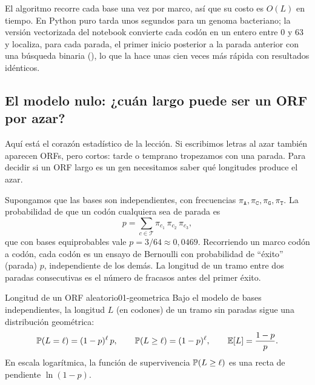 El algoritmo recorre cada base una vez por marco, así que su costo es $O(L)$ en tiempo. En Python puro tarda unos segundos para un genoma bacteriano; la versión vectorizada del notebook convierte cada codón en un entero entre 0 y 63 y localiza, para cada parada, el primer inicio posterior a la parada anterior con una búsqueda binaria (), lo que la hace unas cien veces más rápida con resultados idénticos.

\subsection{El modelo nulo: ¿cuán largo puede ser un ORF por azar?}

Aquí está el corazón estadístico de la lección. Si escribimos letras al azar también aparecen ORFs, pero cortos: tarde o temprano tropezamos con una parada. Para decidir si un ORF largo es un gen necesitamos saber qué longitudes produce el azar.

Supongamos que las bases son independientes, con frecuencias $\pi_\texttt{A},\pi_\texttt{C},\pi_\texttt{G},\pi_\texttt{T}$. La probabilidad de que un codón cualquiera sea de parada es
\begin{equation}\label{eq:01-pstop}
p = \sum_{c\in\mathcal{T}} \pi_{c_1}\,\pi_{c_2}\,\pi_{c_3},
\end{equation}
que con bases equiprobables vale $p=3/64\approx 0{,}0469$. Recorriendo un marco codón a codón, cada codón es un ensayo de Bernoulli con probabilidad de ``éxito'' (parada) $p$, independiente de los demás. La longitud de un tramo entre dos paradas consecutivas es el número de fracasos antes del primer éxito.

\begin{teorema}{Longitud de un ORF aleatorio}{01-geometrica}
Bajo el modelo de bases independientes, la longitud $L$ (en codones) de un tramo sin paradas sigue una distribución geométrica:
\begin{equation}\label{eq:01-geom}
\mathbb{P}(L=\ell) = (1-p)^{\ell}\,p,\qquad
\mathbb{P}(L\ge\ell) = (1-p)^{\ell},\qquad
\mathbb{E}[L] = \frac{1-p}{p}.
\end{equation}
En escala logarítmica, la función de supervivencia $\mathbb{P}(L\ge\ell)$ es una recta de pendiente $\ln(1-p)$.
\end{teorema}

\begin{simbolos}
\end{simbolos}

